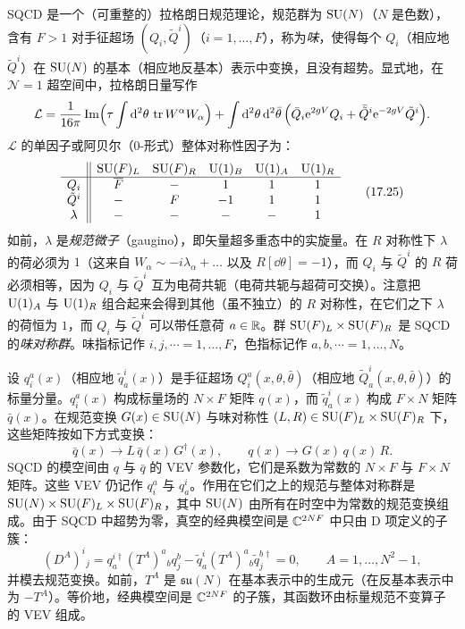 SQCD 是一个（可重整的）拉格朗日规范理论，规范群为 $\operatorname{SU}(N)$（$N$ 是色数），含有 $F>1$ 对手征超场 $(Q_i,\tilde Q^i)$（$i=1,\dots,F$），称为\emph{味}，使得每个 $Q_i$（相应地 $\tilde Q^i$）在 $\operatorname{SU}(N)$ 的基本（相应地反基本）表示中变换，且没有超势。显式地，在 $\mathcal{N}=1$ 超空间中，拉格朗日量写作
\[
\mathcal{L}=\frac{1}{16\pi}\operatorname{Im}\Bigl(\tau\int\mathrm{d}^2\theta\,\operatorname{tr}W^\alpha W_\alpha\Bigr)+\int\mathrm{d}^2\theta\,\mathrm{d}^2\bar\theta\,\Bigl(\bar Q_i \mathrm{e}^{2gV}Q_i+\bar{\tilde Q}^i\mathrm{e}^{-2gV}\tilde Q^i\Bigr).
\]
$\mathcal{L}$ 的单因子或阿贝尔（0-形式）整体对称性因子为：
\begin{equation}
\begin{array}{c||ccccc}
 & \operatorname{SU}(F)_L & \operatorname{SU}(F)_R & \operatorname{U}(1)_B & \operatorname{U}(1)_A & \operatorname{U}(1)_R\\ \hline
Q_i & \overline F & - & 1 & 1 & 1\\
\tilde Q^i & - & F & -1 & 1 & 1\\
\lambda & - & - & - & - & 1
\end{array}
\tag{17.25}
\end{equation}
如前，$\lambda$ 是\emph{规范微子}（gaugino），即矢量超多重态中的实旋量。在 $R$ 对称性下 $\lambda$ 的荷必须为 $1$（这来自 $W_\alpha\sim-i\lambda_\alpha+\dots$ 以及 $R[\dd\theta]=-1$），而 $Q_i$ 与 $\tilde Q^i$ 的 $R$ 荷必须相等，因为 $Q_i$ 与 $\tilde Q^i$ 互为电荷共轭（电荷共轭与超荷可交换）。注意把 $\operatorname{U}(1)_A$ 与 $\operatorname{U}(1)_R$ 组合起来会得到其他（虽不独立）的 $R$ 对称性，在它们之下 $\lambda$ 的荷恒为 $1$，而 $Q_i$ 与 $\tilde Q^i$ 可以带任意荷 $a\in\mathbb{R}$。群 $\operatorname{SU}(F)_L\times\operatorname{SU}(F)_R$ 是 SQCD 的\emph{味对称群}。味指标记作 $i,j,\cdots=1,\dots,F$，色指标记作 $a,b,\cdots=1,\dots,N$。

设 $q^a_i(x)$（相应地 $\tilde q^i_a(x)$）是手征超场 $Q^a_i(x,\theta,\bar\theta)$（相应地 $\tilde Q^i_a(x,\theta,\bar\theta)$）的标量分量。$q^a_i(x)$ 构成标量场的 $N\times F$ 矩阵 $q(x)$，而 $\tilde q^i_a(x)$ 构成 $F\times N$ 矩阵 $\bar q(x)$。在规范变换 $G(x)\in\operatorname{SU}(N)$ 与味对称性 $(L,R)\in\operatorname{SU}(F)_L\times\operatorname{SU}(F)_R$ 下，这些矩阵按如下方式变换：
\[
\bar q(x)\to L\,\bar q(x)\,G^\dagger(x),\qquad q(x)\to G(x)\,q(x)\,R.
\]
SQCD 的模空间由 $q$ 与 $\bar q$ 的 VEV 参数化，它们是系数为常数的 $N\times F$ 与 $F\times N$ 矩阵。这些 VEV 仍记作 $q^a_i$ 与 $q^i_a$。作用在它们之上的规范与整体对称群是 $\operatorname{SU}(N)\times\operatorname{SU}(F)_L\times\operatorname{SU}(F)_R$，其中 $\operatorname{SU}(N)$ 由所有在时空中为常数的规范变换组成。由于 SQCD 中超势为零，真空的经典模空间是 $\mathbb{C}^{2NF}$ 中只由 D 项定义的子簇：
\[
(D^A)^i{}_j=q^{i\dagger}_a(T^A)^a{}_b q^b_j-\tilde q^i_a(T^A)^a{}_b\tilde q^{b\dagger}_j=0,
\qquad A=1,\dots,N^2-1,
\]
并模去规范变换。如前，$T^A$ 是 $\mathfrak{su}(N)$ 在基本表示中的生成元（在反基本表示中为 $-T^A$）。等价地，经典模空间是 $\mathbb{C}^{2NF}$ 的子簇，其函数环由标量规范不变算子的 VEV 组成。

